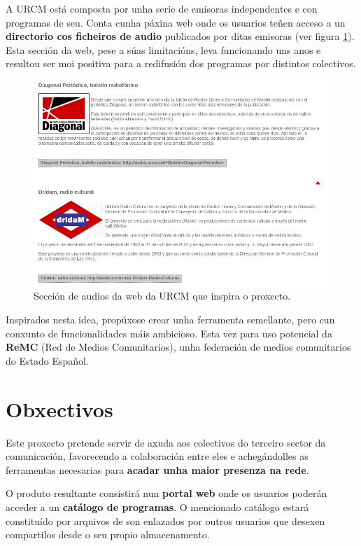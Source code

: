 A URCM está composta por unha serie de emisoras independentes e con programas de seu. Conta cunha páxina web onde os usuarios teñen acceso a un \textbf{directorio cos ficheiros de audio} publicados por ditas emisoras (ver figura \ref{fig:urcm})\cite{urcm}. Esta sección da web, pese a súas limitacións, leva funcionando uns anos e resultou ser moi positiva para a redifusión dos programas por distintos colectivos.


\begin{figure}[h]
	\centering
	\includegraphics[scale=0.55,keepaspectratio=true]{./images/urcm.png}
	\caption{Sección de audios da web da URCM que inspira o proxecto.}
	\label{fig:urcm}
\end{figure}

Inspirados nesta idea, propúxose crear unha ferramenta semellante, pero cun conxunto de funcionalidades máis ambicioso. Esta vez para uso potencial da \textbf{ReMC} (Red de Medios Comunitarios), unha federación de medios comunitarios do Estado Español.


\section{Obxectivos}
\label{obxectivos}

Este proxecto pretende servir de axuda aos colectivos do terceiro sector da comunicación, favorecendo a colaboración entre eles e achegándolles as ferramentas necesarias para \textbf{acadar unha maior presenza na rede}.

O produto resultante consistirá nun \textbf{portal web} onde os usuarios poderán acceder a un \textbf{catálogo de programas}. O mencionado catálogo estará constituído por arquivos de son enlazados por outros usuarios que desexen compartilos desde o seu propio almacenamento.

